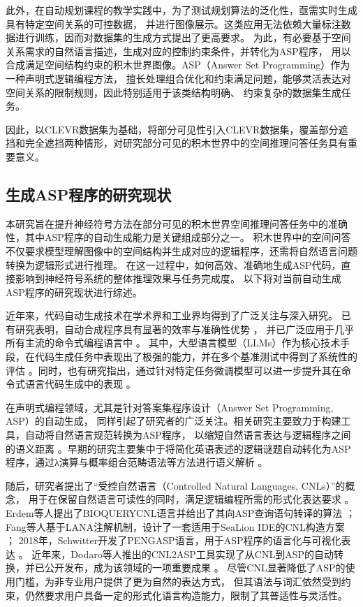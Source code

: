 此外，在自动规划课程的教学实践中，为了测试规划算法的泛化性，亟需实时生成具有特定空间关系的可控数据，
并进行图像展示。这类应用无法依赖大量标注数据进行训练，因而对数据集的生成方式提出了更高要求。
为此，有必要基于空间关系需求的自然语言描述，生成对应的控制约束条件，并转化为ASP程序，
用以合成满足空间结构约束的积木世界图像。ASP（Answer Set Programming）作为一种声明式逻辑编程方法，
擅长处理组合优化和约束满足问题，能够灵活表达对空间关系的限制规则，因此特别适用于该类结构明确、
约束复杂的数据集生成任务。

因此，以CLEVR数据集为基础，将部分可见性引入CLEVR数据集，覆盖部分遮挡和完全遮挡两种情形，对研究部分可见的积木世界中的空间推理问答任务具有重要意义。
\subsection{生成ASP程序的研究现状}
本研究旨在提升神经符号方法在部分可见的积木世界空间推理问答任务中的准确性，其中ASP程序的自动生成能力是关键组成部分之一。
积木世界中的空间问答不仅要求模型理解图像中的空间结构并生成对应的逻辑程序，还需将自然语言问题转换为逻辑形式进行推理。
在这一过程中，如何高效、准确地生成ASP代码，直接影响到神经符号系统的整体推理效果与任务完成度。
以下将对当前自动生成ASP程序的研究现状进行综述。

近年来，代码自动生成技术在学术界和工业界均得到了广泛关注与深入研究。
已有研究表明，自动合成程序具有显著的效率与准确性优势 \cite{ernst2022ai}\cite{peng2023impact}\cite{dakhel2023github}，
并已广泛应用于几乎所有主流的命令式编程语言中 \cite{chen2021evaluating}。
其中，大型语言模型（LLMs）作为核心技术手段，在代码生成任务中表现出了极强的能力，并在多个基准测试中得到了系统性的评估 \cite{xu2022systematic}\cite{wang2023codet5+}。同时，也有研究指出，通过针对特定任务微调模型可以进一步提升其在命令式语言代码生成中的表现 \cite{ma2024llamoco}。

在声明式编程领域，尤其是针对答案集程序设计（Answer Set Programming, ASP）的自动生成，
同样引起了研究者的广泛关注。相关研究主要致力于构建工具，自动将自然语言规范转换为ASP程序，
以缩短自然语言表达与逻辑程序之间的语义距离 \cite{erdem2009transforming}\cite{fang2017approach}\cite{schwitter2018specifying}\cite{caruso2024cnl2asp}。早期的研究主要集中于将简化英语表述的逻辑谜题自动转化为ASP程序，通过λ演算与概率组合范畴语法等方法进行语义解析 \cite{baral2012solving}。

随后，研究者提出了“受控自然语言（Controlled Natural Languages, CNLs）”的概念，
用于在保留自然语言可读性的同时，满足逻辑编程所需的形式化表达要求 \cite{kuhn2014survey}。
Erdem等人提出了BIOQUERYCNL语言并给出了其向ASP查询语句转译的算法 \cite{erdem2009transforming}；
Fang等人基于LANA注解机制，设计了一套适用于SeaLion IDE的CNL构造方案 \cite{fang2017approach}；
2018年，Schwitter开发了PENGASP语言，用于ASP程序的语言化与可视化表达 \cite{schwitter2018specifying}。
近年来，Dodaro等人推出的CNL2ASP工具实现了从CNL到ASP的自动转换，并已公开发布，成为该领域的一项重要成果 \cite{caruso2024cnl2asp}。
尽管CNL显著降低了ASP的使用门槛，为非专业用户提供了更为自然的表达方式，
但其语法与词汇依然受到约束，仍然要求用户具备一定的形式化语言构造能力，限制了其普适性与灵活性。


